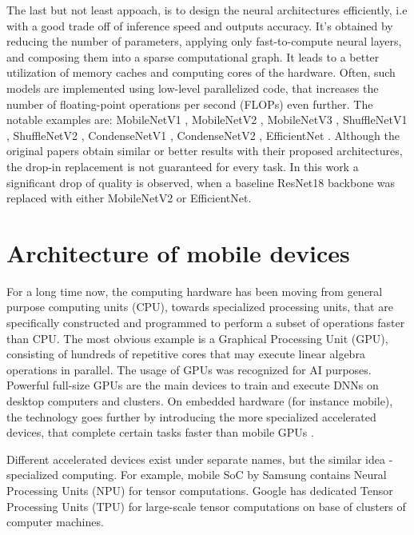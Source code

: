 The last but not least appoach, is to design the neural architectures efficiently, i.e with a good trade off of inference speed and outputs accuracy. It's obtained by reducing the number of parameters, applying only fast-to-compute neural layers, and composing them into a sparse computational graph. It leads to a better utilization of memory caches and computing cores of the hardware. Often, such models are implemented using low-level parallelized code, that increases the number of floating-point operations per second (FLOPs) even further. The notable examples are: MobileNetV1 \cite{dnn:mnv1-17}, MobileNetV2 \cite{dnn:mnv2-18}, MobileNetV3 \cite{dnn:mnv3-19},  ShuffleNetV1 \cite{dnn:shufflenetv1-18}, ShuffleNetV2 \cite{dnn:shufflenetv2-18}, CondenseNetV1 \cite{dnn:condensenetv1-18}, CondenseNetV2 \cite{dnn:condensenetv2-21}, EfficientNet \cite{dnn:efficientnetv1-19}. Although the original papers obtain similar or better results with their proposed architectures, the drop-in replacement is not guaranteed for every task. In this work a significant drop of quality is observed, when a baseline ResNet18 backbone was replaced with either MobileNetV2 or EfficientNet.

%

\section{Architecture of mobile devices}
\label{lit:mobile}

For a long time now, the computing hardware has been moving from general purpose computing units (CPU), towards specialized processing units, that are specifically constructed and programmed to perform a subset of operations faster than CPU. The most obvious example is a Graphical Processing Unit (GPU), consisting of hundreds of repetitive cores that may execute linear algebra operations in parallel. The usage of GPUs was recognized for AI purposes. Powerful full-size GPUs are the main devices to train and execute DNNs on desktop computers and clusters. On embedded hardware (for instance mobile), the technology goes further by introducing the more specialized accelerated devices, that complete certain tasks faster than mobile GPUs \cite{mobile:dl-review19}.

Different accelerated devices exist under separate names, but the similar idea - specialized computing. For example, mobile SoC by Samsung contains Neural Processing Units (NPU) for tensor computations. Google has dedicated Tensor Processing Units (TPU) for large-scale tensor computations on base of clusters of computer machines.

